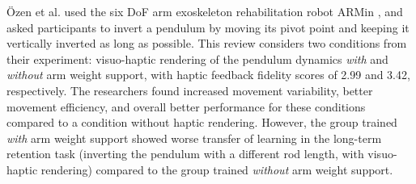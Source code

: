 Özen et al. used the six DoF arm exoskeleton rehabilitation robot ARMin \cite{Just2018ExoskeletonObserver}, and asked participants to invert a pendulum by moving its pivot point and keeping it vertically inverted as long as possible. This review considers two conditions from their experiment: visuo-haptic rendering of the pendulum dynamics \textit{with} and \textit{without} arm weight support, with haptic feedback fidelity scores of 2.99 and 3.42, respectively. The researchers found increased movement variability, better movement efficiency, and overall better performance for these conditions compared to a condition without haptic rendering. However, the group trained \textit{with} arm weight support showed worse transfer of learning in the long-term retention task (inverting the pendulum with a different rod length, with visuo-haptic rendering) compared to the group trained \textit{without} arm weight support.

